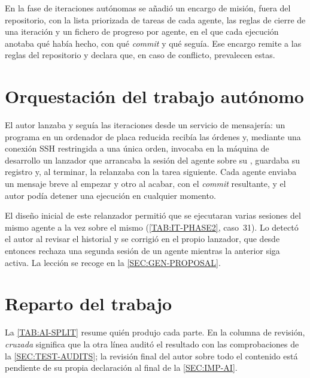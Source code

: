 En la fase de iteraciones autónomas se añadió un encargo de misión, fuera del repositorio,
con la lista priorizada de tareas de cada agente, las reglas de cierre de una iteración y un
fichero de progreso por agente, en el que cada ejecución anotaba qué había hecho, con qué
\textit{commit} y qué seguía. Ese encargo remite a las reglas del repositorio y declara que,
en caso de conflicto, prevalecen estas.

\section*{Orquestación del trabajo autónomo}

El autor lanzaba y seguía las iteraciones desde un servicio de mensajería: un programa en
un ordenador de placa reducida recibía las órdenes y, mediante una conexión SSH restringida
a una única orden, invocaba en la máquina de desarrollo un lanzador que arrancaba la sesión
del agente sobre su , guardaba su registro y, al terminar, la relanzaba con la
tarea siguiente. Cada agente enviaba un mensaje breve al empezar y otro al acabar, con el
\textit{commit} resultante, y el autor podía detener una ejecución en cualquier momento.

El diseño inicial de este relanzador permitió que se ejecutaran varias sesiones del mismo
agente a la vez sobre el mismo  (\cref{TAB:IT-PHASE2}, caso~31). Lo detectó
el autor al revisar el historial y se corrigió en el propio lanzador, que desde entonces
rechaza una segunda sesión de un agente mientras la anterior siga activa. La lección se
recoge en la \cref{SEC:GEN-PROPOSAL}.

\section*{Reparto del trabajo}

La \cref{TAB:AI-SPLIT} resume quién produjo cada parte. En la columna de revisión,
\emph{cruzada} significa que la otra línea auditó el resultado con las comprobaciones de la
\cref{SEC:TEST-AUDITS}; la revisión final del autor sobre todo el contenido está pendiente
de su propia declaración al final de la \cref{SEC:IMP-AI}.

